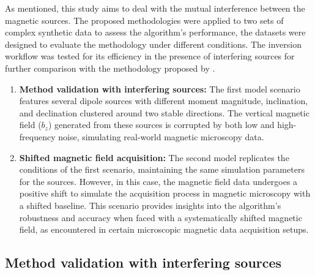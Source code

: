 As mentioned, this study aims to deal with the mutual interference between the magnetic sources. The proposed methodologies were applied to two sets of complex synthetic data to assess the algorithm's performance, the datasets were designed to evaluate the methodology under different conditions. The inversion workflow was tested for its efficiency in the presence of interfering sources for further comparison with the methodology proposed by  \citet{Souza-Junior2023b}.

\begin{enumerate}
\item \textbf{Method validation with interfering sources:}
The first model scenario features several dipole sources with different moment magnitude, inclination, and declination clustered around two stable directions. The vertical magnetic field ($b_z$) generated from these sources is corrupted by both low and high-frequency noise, simulating real-world magnetic microscopy data. 

\item \textbf{Shifted magnetic field acquisition:}
The second model replicates the conditions of the first scenario, maintaining the same simulation parameters for the sources. However, in this case, the magnetic field data undergoes a positive shift to simulate the acquisition process in magnetic microscopy with a shifted baseline. This scenario provides insights into the algorithm's robustness and accuracy when faced with a systematically shifted magnetic field, as encountered in certain microscopic magnetic data acquisition setups.
\end{enumerate}

\subsection{Method validation with interfering sources}\label{non-shifted}

